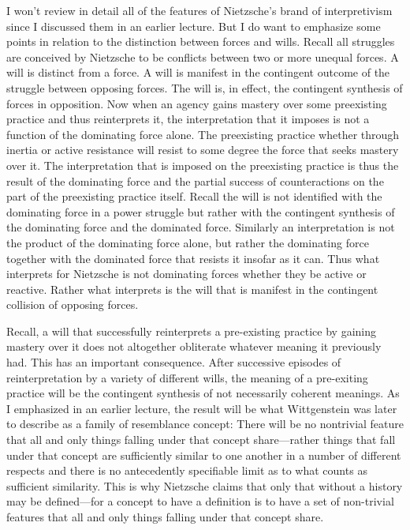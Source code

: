 I won't review in detail all of the features of Nietzsche's brand of interpretivism since I discussed them in an earlier lecture. But I do want to emphasize some points in relation to the distinction between forces and wills. Recall all struggles are conceived by Nietzsche to be conflicts between two or more unequal forces. A will is distinct from a force. A will is manifest in the contingent outcome of the struggle between opposing forces. The will is, in effect, the contingent synthesis of forces in opposition. Now when an agency gains mastery over some preexisting practice and thus reinterprets it, the interpretation that it imposes is not a function of the dominating force alone. The preexisting practice whether through inertia or active resistance will resist to some degree the force that seeks mastery over it. The interpretation that is imposed on the preexisting practice is thus the result of the dominating force and the partial success of counteractions on the part of the preexisting practice itself. Recall the will is not identified with the dominating force in a power struggle but rather with the contingent synthesis of the dominating force and the dominated force. Similarly an interpretation is not the product of the dominating force alone, but rather the dominating force together with the dominated force that resists it insofar as it can. Thus what interprets for Nietzsche is not dominating forces whether they be active or reactive. Rather what interprets is the will that is manifest in the contingent collision of opposing forces. \change

Recall, a will that successfully reinterprets a pre-existing practice by gaining mastery over it does not altogether obliterate whatever meaning it previously had. This has an important consequence. After successive episodes of reinterpretation by a variety of different wills, the meaning of a pre-exiting practice will be the contingent synthesis of not necessarily coherent meanings. As I emphasized in an earlier lecture, the result will be what Wittgenstein was later to describe as a family of resemblance concept: There will be no nontrivial feature that all and only things falling under that concept share---rather things that fall under that concept are sufficiently similar to one another in a number of different respects and there is no antecedently specifiable limit as to what counts as sufficient similarity. This is why Nietzsche claims that only that without a history may be defined---for a concept to have a definition is to have a set of non-trivial features that all and only things falling under that concept share. \change


